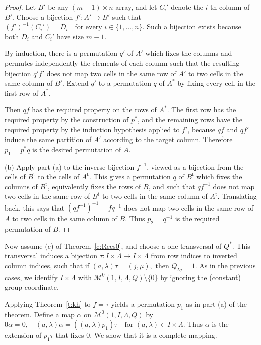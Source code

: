 \documentclass[11pt]{article}
\theoremstyle{plain}
\theoremstyle{remark}
\theoremstyle{definition}
\theoremstyle{plain}
\begin{document}
\begin{proof}
	Let $B'$ be any $(m-1)\times n$ array, and let $C_i'$ denote the $i$-th
	column of $B'$. Choose a bijection
\(f'\colon A'\longrightarrow B'\)
	such that
\((f')^{-1}(C_i')=D_i \quad\text{for every }i\in\{1,\ldots,n\}.\)
	Such a bijection exists because both $D_i$ and $C_i'$ have size $m-1$.

	By induction, there is a permutation $q'$ of $A'$ which fixes the columns
	and permutes independently the elements of each column such that the
	resulting bijection $q'f'$ does not map two cells in the same row of $A'$
	to two cells in the same column of $B'$. Extend $q'$ to a permutation $q$
	of $A^*$ by fixing every cell in the first row of $A^*$.

	Then $qf$ has the required property on the rows of $A^*$. The first row
	has the required property by the construction of $p^*$, and the remaining
	rows have the required property by the induction hypothesis applied to
	$f'$, because $qf$ and $qf'$ induce the same partition of $A'$ according
	to the target column. Therefore
\(p_1=p^*q\)
	is the desired permutation of $A$.

	\medskip

	(b) Apply part (a) to the inverse bijection $f^{-1}$, viewed as a
	bijection from the cells of $B^{\mathrm t}$ to the cells of
	$A^{\mathrm t}$. This gives a permutation $q$ of $B^{\mathrm t}$ which
	fixes the columns of $B^{\mathrm t}$, equivalently fixes the rows of $B$,
	and such that $qf^{-1}$ does not map two cells in the same row of
	$B^{\mathrm t}$ to two cells in the same column of $A^{\mathrm t}$.
	Translating back, this says that $(qf^{-1})^{-1}=fq^{-1}$ does not map
	two cells in the same row of $A$ to two cells in the same column of $B$.
	Thus $p_2=q^{-1}$ is the required permutation of $B$.
\end{proof}

Now assume (c) of Theorem~\ref{c:Rees0}, and choose a one-transversal
of $Q^*$. This transversal induces a bijection
\(\tau\colon I\times\Lambda\longrightarrow I\times\Lambda\)
from row indices to inverted column indices, such that if
\((a,\lambda)\tau=(j,\mu),\)
then $Q_{\lambda j}=1$. As in the previous cases, we identify $I\times\Lambda$ with $\mathcal M^0(1,I,\Lambda,Q)\setminus \{0\}$ by ignoring the (constant) group coordinate.

Applying Theorem~\ref{t:kh} to $f=\tau$ yields a permutation $p_1$ as in part (a) of the theorem. Define a map $\alpha$ on $\mathcal M^0(1,I,\Lambda,Q)$ by
\(0\alpha=0,\quad (a,\lambda)\alpha=((a,\lambda)p_1)\tau\quad\text{for }(a,\lambda)\in I\times\Lambda.\)
Thus $\alpha$ is the extension of $p_1\tau$ that fixes $0$. We show that it is a complete mapping.
\end{document}
